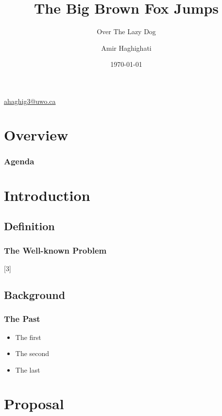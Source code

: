 \documentclass[11pt]{beamer}
\begin{document}
	\author{Amir Haghighati}
	\title{The Big Brown Fox Jumps}
	\subtitle{Over The Lazy Dog}
	\date{\today}
	\subject{Lab Presentations}
	\begin{frame}
	\maketitle
	\centering\tiny\hyperlink{ahaghig3@uwo.ca}{ahaghig3@uwo.ca}
\end{frame}

\section*{Overview}
\begin{frame}
\frametitle{Agenda}
\tableofcontents
\end{frame}

\section{Introduction}
\subsection{Definition}
\begin{frame}
\frametitle{The Well-known Problem}
\end{frame}

\subsection{Background}
\begin{frame}
\frametitle{The Past}
	\begin{itemize}
		\item<1->The first
		\item<2->The second
		\item<3->The last
	\end{itemize}
\end{frame}

\section{Proposal}
\end{document}
